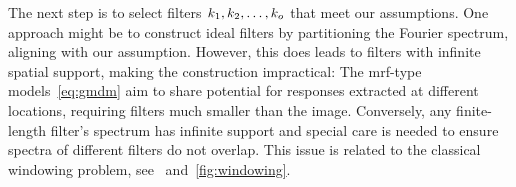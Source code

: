 The next step is to select filters \( k_{\num{1}}, k_{\num{2}}, \dotsc, k_o \) that meet our assumptions.
One approach might be to construct ideal filters by partitioning the Fourier spectrum, aligning with our assumption.
However, this does leads to filters with infinite spatial support, making the construction impractical:
The \gls{mrf}-type models~\eqref{eq:gmdm} aim to share potential for responses extracted at different locations, requiring filters much smaller than the image.
Conversely, any finite-length filter's spectrum has infinite support and special care is needed to ensure spectra of different filters do not overlap.
This issue is related to the classical windowing problem, see~\cite[section 7.5]{oppenheim2009discrete} and~\cref{fig:windowing}.
\begin{figure}
	\centering
\end{figure}

